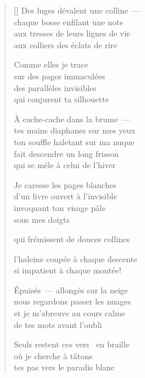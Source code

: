 \documentclass[12pt,a4paper]{article}
\begin{document}
\begin{verse}[\versewidth]
  Des luges dévalent une colline~--- \\
  chaque bosse enfilant une note \\
  aux tresses de leurs lignes de vie \\
  aux colliers des éclats de rire

  Comme elles je trace \\
  sur des pages immaculées \\
  des parallèles invisibles \\
  qui conjurent ta silhouette

  À cache-cache dans la brume~--- \\
  tes mains diaphanes sur mes yeux \\
  ton souffle haletant sur ma nuque \\
  fait descendre un long frisson \\
  qui se mêle à celui de l'hiver

  Je caresse les pages blanches \\
  d'un livre ouvert à l'invisible \\
  invoquant ton visage pâle \\
  sous mes doigts

  qui frémissent de douces collines

  l'haleine coupée à chaque descente \\
  si impatient à chaque montée!

  Épuisés~--- allongés sur la neige \\
  nous regardons passer les nuages \\
  et je m'abreuve au cours calme \\
  de tes mots avant l'oubli

  Seuls restent ces vers \
  en braille \\
  où je cherche à tâtons \\
  tes pas vers le paradis blanc
\end{verse}


\newpage

\poemtitle{}

\settowidth{\versewidth}{où je t'ai réchauffée}

\bigskip
\end{document}
